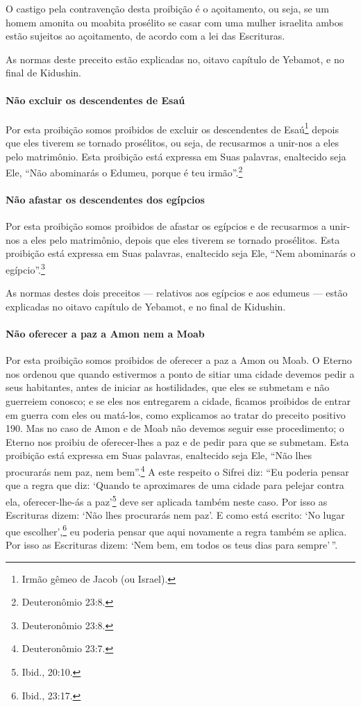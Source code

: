 O castigo pela contravenção desta proibição é o açoitamento, ou seja,
se um homem amonita ou moabita prosélito se casar com uma mulher
israelita ambos estão sujeitos ao açoitamento, de acordo com a lei das
Escrituras.

As normas deste preceito estão explicadas no, oitavo capítulo de
Yebamot, e no final de Kidushin.


\paragraph{Não excluir os descendentes de Esaú}

Por esta proibição somos proibidos de excluir os descendentes de
Esaú\footnote{Irmão gêmeo de Jacob (ou Israel).} depois que eles tiverem se tornado
prosélitos, ou seja, de recusarmos a unir-nos a eles pelo matrimônio.
Esta proibição está expressa em Suas palavras, enaltecido seja Ele,
``Não abominarás o Edumeu, porque é teu irmão''.\footnote{Deuteronômio 23:8.}

\paragraph{Não afastar os descendentes dos egípcios}

Por esta proibição somos proibidos de afastar os egípcios e de
recusarmos a unir-nos a eles pelo matrimônio, depois que eles tiverem se
tornado prosélitos. Esta proibição está expressa em Suas palavras,
enaltecido seja Ele, ``Nem abominarás o egípcio''.\footnote{Deuteronômio 23:8.}

As normas destes dois preceitos --- relativos aos egípcios e aos edumeus
--- estão explicadas no oitavo capítulo de Yebamot, e no final de
Kidushin.

\paragraph{Não oferecer a paz a Amon nem a Moab}

Por esta proibição somos proibidos de oferecer a paz a Amon ou Moab. O
Eterno nos ordenou que quando estivermos a ponto de sitiar uma cidade
devemos pedir a seus habitantes, antes de iniciar as hostilidades, que
eles se submetam e não guerreiem conosco; e se eles nos entregarem a
cidade, ficamos proibidos de entrar em guerra com eles ou matá-los,
como explicamos ao tratar do preceito positivo 190. Mas no caso de Amon
e de Moab não devemos seguir esse procedimento; o Eterno nos proibiu de
oferecer-lhes a paz e de pedir para que se submetam. Esta proibição
está expressa em Suas palavras, enaltecido seja Ele, ``Não lhes
procurarás nem paz, nem bem''.\footnote{Deuteronômio 23:7.} A este respeito o
Sifrei diz: ``Eu poderia pensar que a regra que diz: `Quando te
aproximares de uma cidade para pelejar contra ela, oferecer-lhe-ás a
paz'\footnote{Ibid., 20:10.} deve ser aplicada também neste caso. Por isso as
Escrituras dizem: `Não lhes procurarás nem paz'. E como está escrito:
`No lugar que escolher',\footnote{Ibid., 23:17.} eu poderia pensar que aqui
novamente a regra também se aplica. Por isso as Escrituras dizem: `Nem
bem, em todos os teus dias para sempre'\,''.

